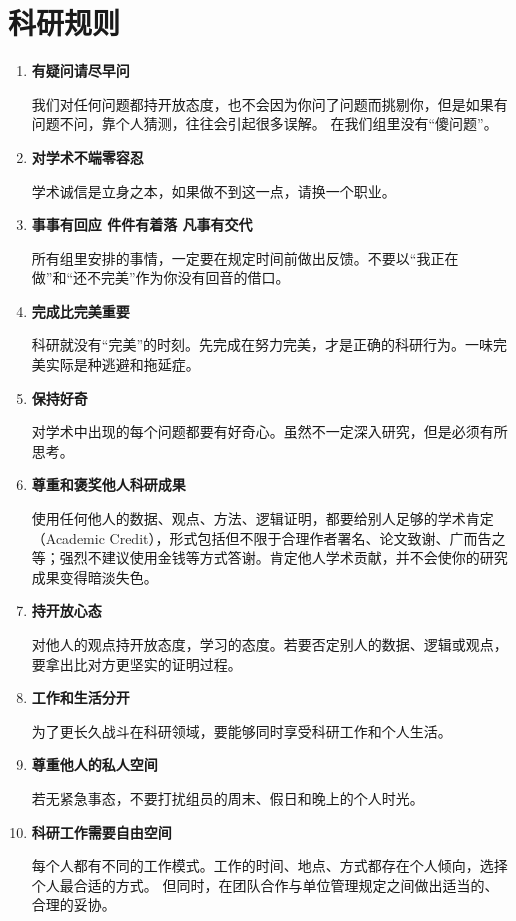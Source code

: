 \documentclass[
]{ctexbook}
\begin{document}
\hypertarget{ux79d1ux7814ux89c4ux5219}{%
\section{科研规则}\label{ux79d1ux7814ux89c4ux5219}}

\begin{enumerate}
\def\labelenumi{\arabic{enumi}.}
\item
  \textbf{有疑问请尽早问}

  我们对任何问题都持开放态度，也不会因为你问了问题而挑剔你，但是如果有问题不问，靠个人猜测，往往会引起很多误解。
  在我们组里没有``傻问题''。
\item
  \textbf{对学术不端零容忍}

  学术诚信是立身之本，如果做不到这一点，请换一个职业。
\item
  \textbf{事事有回应 件件有着落 凡事有交代}

  所有组里安排的事情，一定要在规定时间前做出反馈。不要以``我正在做''和``还不完美''作为你没有回音的借口。
\item
  \textbf{完成比完美重要}

  科研就没有``完美''的时刻。先完成在努力完美，才是正确的科研行为。一味完美实际是种逃避和拖延症。
\item
  \textbf{保持好奇}

  对学术中出现的每个问题都要有好奇心。虽然不一定深入研究，但是必须有所思考。
\item
  \textbf{尊重和褒奖他人科研成果}

  使用任何他人的数据、观点、方法、逻辑证明，都要给别人足够的学术肯定（Academic Credit），形式包括但不限于合理作者署名、论文致谢、广而告之等；强烈不建议使用金钱等方式答谢。肯定他人学术贡献，并不会使你的研究成果变得暗淡失色。
\item
  \textbf{持开放心态}

  对他人的观点持开放态度，学习的态度。若要否定别人的数据、逻辑或观点，要拿出比对方更坚实的证明过程。
\item
  \textbf{工作和生活分开}

  为了更长久战斗在科研领域，要能够同时享受科研工作和个人生活。
\item
  \textbf{尊重他人的私人空间}

  若无紧急事态，不要打扰组员的周末、假日和晚上的个人时光。
\item
  \textbf{科研工作需要自由空间}

  每个人都有不同的工作模式。工作的时间、地点、方式都存在个人倾向，选择个人最合适的方式。 但同时，在团队合作与单位管理规定之间做出适当的、合理的妥协。
\end{enumerate}
\end{document}
